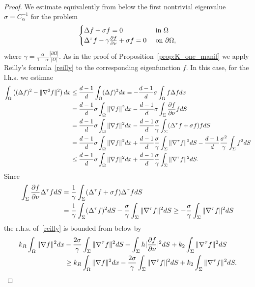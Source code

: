 \documentclass[a4paper]{article}
\theoremstyle{definition}
\numberwithin{equation}{section}
\begin{document}
\begin{proof} We estimate equivalently from below the first nontrivial eigenvalue  $\sigma=C_\alpha^{-1}$ for the problem  \[
\begin{cases}
\Delta f + \sigma f = 0 & \mbox{ in } \Omega\\
\Delta^\tau f - \gamma \frac{\partial f}{\partial \nu} + \sigma f =0 & \mbox{ on } \partial \Omega,
\end{cases}\]
where $\gamma = \frac \alpha {1-\alpha} \frac{|\partial \Omega|}{|\Omega|}$. As in the proof of Proposition~\ref{prop:K_one_manif} we apply  Reilly's formula~\eqref{reilly} to the corresponding eigenfunction $f$. In this case, for the l.h.s. we estimae 
\begin{align*}
\int_\Omega \left((\Delta f)^2 - \|\nabla^2 f \|^2 \right) dx
& \leq \frac{d-1}{d} \int_\Omega (\Delta f)^2 dx= - \frac {d-1}{d}\sigma \int_\Omega f \Delta f dx \\
& = \frac{d-1}{d}\sigma \int_\Omega \|\nabla f\|^2   dx - \frac {d-1}{d}\sigma \int_\Sigma  \frac{\partial f}{\partial \nu}f dS  \\
& = \frac{d-1}{d}\sigma \int_\Omega \|\nabla f\|^2   dx -
 \frac {d-1}{d}\frac{\sigma}{\gamma} \int_\Sigma (\Delta^\tau f +  {\sigma} f) f dS\\
& = \frac{d-1}{d}\sigma \int_\Omega \|\nabla f\|^2   dx + 
 \frac {d-1}{d}\frac{\sigma}{\gamma} \int_\Sigma \|\nabla^\tau f\|^2  dS -  \frac {d-1}{d}\frac{\sigma^2 }{\gamma} \int_\Sigma  f^2   dS\\
 & \leq   \frac{d-1}{d}\sigma \int_\Omega \|\nabla f\|^2   dx + 
 \frac {d-1}{d}\frac{\sigma}{\gamma} \int_\Sigma \|\nabla^\tau f\|^2  dS. \end{align*}
Since  
\begin{align*}
\int_\Sigma \frac{\partial f}{\partial \nu} \Delta^\tau f dS & = \frac  1 \gamma \int_\Sigma (\Delta^\tau f + \sigma f) \Delta^\tau f dS\\
& = \frac 1  \gamma \int_\Sigma(\Delta^\tau f)^2 dS - \frac \sigma \gamma \int_\Sigma \|\nabla^\tau f \|^2 dS
\geq - \frac \sigma \gamma \int_\Sigma \|\nabla^\tau f \|^2 dS
\end{align*}
the r.h.s. of~\eqref{reilly} is bounded from below by 
\begin{align*} 
 k_R \int_\Omega  \|\nabla f\|^2 dx    &- \frac {2 \sigma}  \gamma \int_\Sigma \|\bnabla f\|^2 dS + \int_\Sigma h |\frac{\partial f}{\partial \nu}|^2 dS + k_2  \int_\Sigma \|\bnabla f\|^2 dS
\\
& \geq k_R \int_\Omega \|\nabla f\|^2 dx   - \frac {2 \sigma}  \gamma \int_\Sigma \|\bnabla f\|^2 dS + k_2 \int_\Sigma  \|\bnabla f\|^2 dS. 

\end{align*}
\end{proof}
\end{document}

